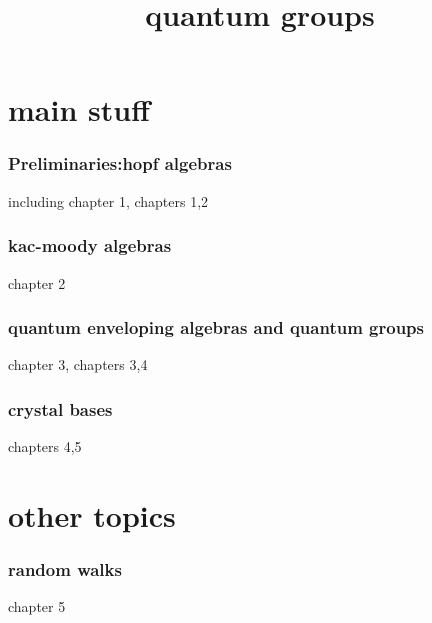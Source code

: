\documentclass{article}
\title{quantum groups}
\author{}
\begin{document}
\maketitle

\part{main stuff}

\section{Preliminaries:hopf algebras}
including \cite{hk} chapter 1, \cite{majid} chapters 1,2

\section{kac-moody algebras}
\cite{hk} chapter 2

\section{quantum enveloping algebras and quantum groups}

\cite{hk} chapter 3, \cite{majid} chapters 3,4

\section{crystal bases}
\cite{hk} chapters 4,5

\part{other topics}

\section{random walks}
\cite{majid} chapter 5
\end{document}
